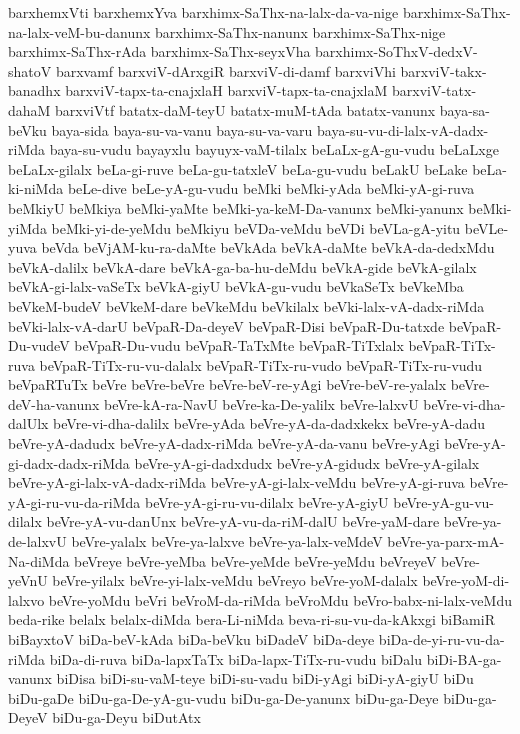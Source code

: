 {barxhemxVti
barxhemxYva
barxhimx-SaThx-na-lalx-da-va-nige
barxhimx-SaThx-na-lalx-veM-bu-danunx
barxhimx-SaThx-nanunx
barxhimx-SaThx-nige
barxhimx-SaThx-rAda
barxhimx-SaThx-seyxVha
barxhimx-SoThxV-dedxV-shatoV
barxvamf
barxviV-dArxgiR
barxviV-di-damf
barxviVhi
barxviV-takx-banadhx
barxviV-tapx-ta-cnajxlaH
barxviV-tapx-ta-cnajxlaM
barxviV-tatx-dahaM
barxviVtf
batatx-daM-teyU
batatx-muM-tAda
batatx-vanunx
baya-sa-beVku
baya-sida
baya-su-va-vanu
baya-su-va-varu
baya-su-vu-di-lalx-vA-dadx-riMda
baya-su-vudu
bayayxlu
bayuyx-vaM-tilalx
beLaLx-gA-gu-vudu
beLaLxge
beLaLx-gilalx
beLa-gi-ruve
beLa-gu-tatxleV
beLa-gu-vudu
beLakU
beLake
beLa-ki-niMda
beLe-dive
beLe-yA-gu-vudu
beMki
beMki-yAda
beMki-yA-gi-ruva
beMkiyU
beMkiya
beMki-yaMte
beMki-ya-keM-Da-vanunx
beMki-yanunx
beMki-yiMda
beMki-yi-de-yeMdu
beMkiyu
beVDa-veMdu
beVDi
beVLa-gA-yitu
beVLe-yuva
beVda
beVjAM-ku-ra-daMte
beVkAda
beVkA-daMte
beVkA-da-dedxMdu
beVkA-dalilx
beVkA-dare
beVkA-ga-ba-hu-deMdu
beVkA-gide
beVkA-gilalx
beVkA-gi-lalx-vaSeTx
beVkA-giyU
beVkA-gu-vudu
beVkaSeTx
beVkeMba
beVkeM-budeV
beVkeM-dare
beVkeMdu
beVkilalx
beVki-lalx-vA-dadx-riMda
beVki-lalx-vA-darU
beVpaR-Da-deyeV
beVpaR-Disi
beVpaR-Du-tatxde
beVpaR-Du-vudeV
beVpaR-Du-vudu
beVpaR-TaTxMte
beVpaR-TiTxlalx
beVpaR-TiTx-ruva
beVpaR-TiTx-ru-vu-dalalx
beVpaR-TiTx-ru-vudo
beVpaR-TiTx-ru-vudu
beVpaRTuTx
beVre
beVre-beVre
beVre-beV-re-yAgi
beVre-beV-re-yalalx
beVre-deV-ha-vanunx
beVre-kA-ra-NavU
beVre-ka-De-yalilx
beVre-lalxvU
beVre-vi-dha-dalUlx
beVre-vi-dha-dalilx
beVre-yAda
beVre-yA-da-dadxkekx
beVre-yA-dadu
beVre-yA-dadudx
beVre-yA-dadx-riMda
beVre-yA-da-vanu
beVre-yAgi
beVre-yA-gi-dadx-dadx-riMda
beVre-yA-gi-dadxdudx
beVre-yA-gidudx
beVre-yA-gilalx
beVre-yA-gi-lalx-vA-dadx-riMda
beVre-yA-gi-lalx-veMdu
beVre-yA-gi-ruva
beVre-yA-gi-ru-vu-da-riMda
beVre-yA-gi-ru-vu-dilalx
beVre-yA-giyU
beVre-yA-gu-vu-dilalx
beVre-yA-vu-danUnx
beVre-yA-vu-da-riM-dalU
beVre-yaM-dare
beVre-ya-de-lalxvU
beVre-yalalx
beVre-ya-lalxve
beVre-ya-lalx-veMdeV
beVre-ya-parx-mA-Na-diMda
beVreye
beVre-yeMba
beVre-yeMde
beVre-yeMdu
beVreyeV
beVre-yeVnU
beVre-yilalx
beVre-yi-lalx-veMdu
beVreyo
beVre-yoM-dalalx
beVre-yoM-di-lalxvo
beVre-yoMdu
beVri
beVroM-da-riMda
beVroMdu
beVro-babx-ni-lalx-veMdu
beda-rike
belalx
belalx-diMda
bera-Li-niMda
beva-ri-su-vu-da-kAkxgi
biBamiR
biBayxtoV
biDa-beV-kAda
biDa-beVku
biDadeV
biDa-deye
biDa-de-yi-ru-vu-da-riMda
biDa-di-ruva
biDa-lapxTaTx
biDa-lapx-TiTx-ru-vudu
biDalu
biDi-BA-ga-vanunx
biDisa
biDi-su-vaM-teye
biDi-su-vadu
biDi-yAgi
biDi-yA-giyU
biDu
biDu-gaDe
biDu-ga-De-yA-gu-vudu
biDu-ga-De-yanunx
biDu-ga-Deye
biDu-ga-DeyeV
biDu-ga-Deyu
biDutAtx
}
